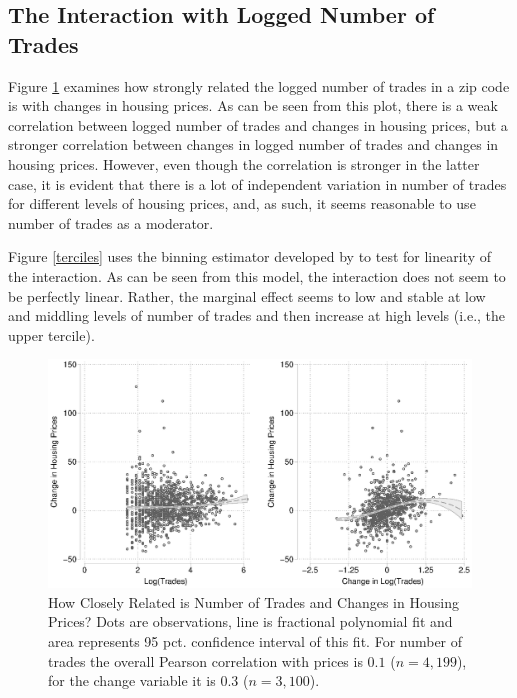 \documentclass[12pt,a4paper]{article}
\begin{document}
			\newpage
			
			\subsection{The Interaction with Logged Number of Trades} \label{app_interaction}
			\setcounter{table}{0}
			\setcounter{figure}{0}
			
			Figure \ref{scatter} examines how strongly related the logged number of trades in a zip code is with changes in housing prices. As can be seen from this plot, there is a weak correlation between logged number of trades and changes in housing prices, but a stronger correlation between changes in logged number of trades and changes in housing prices. However, even though the correlation is stronger in the latter case, it is evident that there is a lot of independent variation in number of trades for different levels of housing prices, and, as such, it seems reasonable to use number of trades as a moderator.
			
			Figure \ref{terciles} uses the binning estimator developed by \cite{hainmueller2016much} to test for linearity of the interaction. As can be seen from this model, the interaction does not seem to be perfectly linear. Rather, the marginal effect seems to low and stable at low and middling levels of number of trades and then increase at high levels (i.e., the upper tercile).
			
			\begin{figure}
				\includegraphics[width=1\textwidth]{../figures/corrmoderator.eps}
				\caption{How Closely Related is Number of Trades and Changes in Housing Prices? Dots are observations, line is fractional polynomial fit and area represents 95 pct. confidence interval of this fit. For number of trades the overall Pearson correlation with prices is $0.1$ ($n=4,199$), for the change variable it is $0.3$ ($n=3,100$). }
				\label{scatter}
			\end{figure}
			
\end{document}
